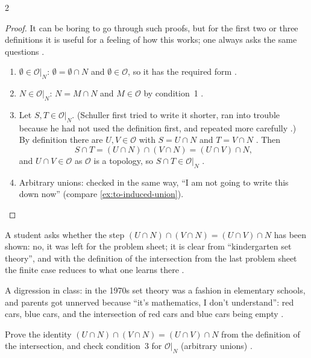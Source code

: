 \begin{paracol}{2}
\begin{proof}
It can be boring to go through such proofs, but for the first two or three definitions it is useful for a feeling of how
this works; one always asks the same questions .
\begin{enumerate}
  \item $\emptyset\in\mathcal O|_N$: $\emptyset=\emptyset\cap N$ and $\emptyset\in\mathcal O$, so it has the required form
        .
  \item $N\in\mathcal O|_N$: $N=M\cap N$ and $M\in\mathcal O$ by condition~1 .
  \item Let $S,T\in\mathcal O|_N$. (Schuller first tried to write it shorter, ran into trouble because he had not used the
        definition first, and repeated more carefully .)
        By definition there are $U,V\in\mathcal O$ with $S=U\cap N$ and $T=V\cap N$
        . Then
        \[
          S\cap T=(U\cap N)\cap(V\cap N)=(U\cap V)\cap N,
        \]
        and $U\cap V\in\mathcal O$ as $\mathcal O$ is a topology, so $S\cap T\in\mathcal O|_N$
        .
  \item Arbitrary unions: checked in the same way, ``I am not going to write this down now'' 
        (compare \cref{ex:to-induced-union}).
\end{enumerate}
\end{proof}
A student asks whether the step $(U\cap N)\cap(V\cap N)=(U\cap V)\cap N$ has been shown: no, it was left for the problem
sheet; it is clear from ``kindergarten set theory'', and with the definition of the intersection from the last problem
sheet the finite case reduces to what one learns there .
\begin{aside}
A digression in class: in the 1970s set theory was a fashion in elementary schools, and parents got unnerved because
``it's mathematics, I don't understand'': red cars, blue cars, and the intersection of red cars and blue cars being empty
.
\end{aside}
\begin{exercise}\label{ex:to-induced-union}
Prove the identity $(U\cap N)\cap(V\cap N)=(U\cap V)\cap N$ from the definition of the intersection, and check
condition~3 for $\mathcal O|_N$ (arbitrary unions) .
\end{exercise}


\end{paracol}
